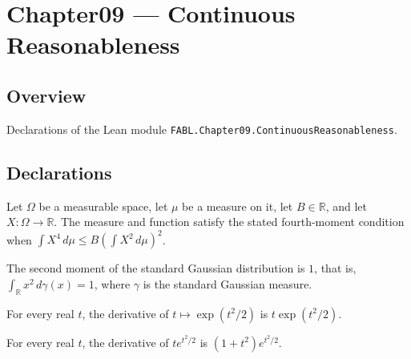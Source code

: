 \chapter{Chapter09 — Continuous Reasonableness}
\section{Overview}

Declarations of the Lean module \texttt{FABL.Chapter09.ContinuousReasonableness}.

\section{Declarations}

\begin{definition}
\label{FABL.IsReasonableMeasure}
\leanok
Let $\Omega$ be a measurable space, let $\mu$ be a measure on it, let $B\in\mathbb{R}$,
and let $X:\Omega\to\mathbb{R}$. The measure and function satisfy the stated
fourth-moment condition when $\int X^4\,d\mu\le B\left(\int X^2\,d\mu\right)^2$.
\end{definition}

\begin{theorem}
\label{FABL.standardGaussian_secondMoment}
\leanok
{}
The second moment of the standard Gaussian distribution is $1$, that is, $\int_{\mathbb
R}x^2\,d\gamma(x)=1$, where $\gamma$ is the standard Gaussian measure.
\end{theorem}

\begin{theorem}
\label{FABL.deriv_exp_half_sq}
\leanok
{}
For every real $t$, the derivative of $t\mapsto \exp(t^2/2)$ is $t\exp(t^2/2)$.
\end{theorem}

\begin{theorem}
\label{FABL.deriv_t_mul_exp_half_sq}
\leanok
{}
For every real $t$, the derivative of $t e^{t^2/2}$ is $(1+t^2)e^{t^2/2}$.
\end{theorem}

